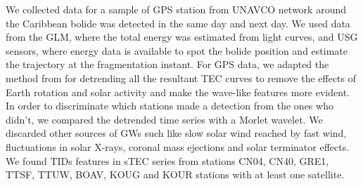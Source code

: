 We collected data for a sample of GPS station from UNAVCO network around the Caribbean bolide was detected in the same day and next day. We used data from the GLM, where the total energy was estimated from light curves, and USG sensors, where energy data is available to spot the bolide position and estimate the trajectory at the fragmentation instant. 
For GPS data, we adapted the method from \citet{Pradipta:2015} for detrending all the resultant TEC curves to remove the effects of Earth rotation and solar activity and make the wave-like features more evident. In order to discriminate which stations made a detection from the ones who didn't, we compared the detrended time series with a Morlet wavelet. We discarded other sources of GWs such like slow solar wind reached by fast wind, fluctuations in solar X-rays, coronal mass ejections and solar terminator effects. We found TIDs features in sTEC series from stations CN04, CN40, GRE1, TTSF, TTUW, BOAV, KOUG and KOUR stations with at least one satellite. 
